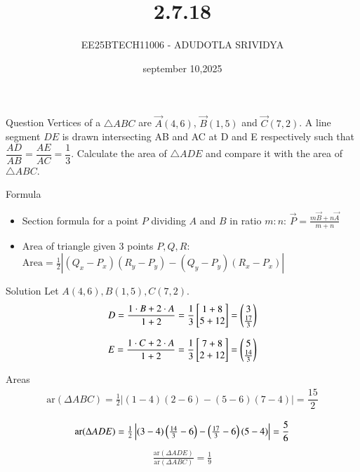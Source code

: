 \documentclass{beamer}
\title %
{2.7.18}
\date{september 10,2025}
\author %
{EE25BTECH11006 - ADUDOTLA SRIVIDYA}
\begin{document}
\frame{\titlepage}

\begin{frame}{Question}
Vertices of a $\triangle ABC$ are $\vec{A}(4,6)$, $\vec{B}(1,5)$ and $\vec{C}(7,2)$.  
A line segment $DE$ is drawn intersecting AB and AC at D and E respectively such that  
$\dfrac{AD}{AB} = \dfrac{AE}{AC} = \dfrac{1}{3}$.  
Calculate the area of $\triangle ADE$ and compare it with the area of $\triangle ABC$.
\end{frame}

\begin{frame}{Formula}
\begin{itemize}
    \item Section formula for a point $P$ dividing $A$ and $B$ in ratio $m:n$:
    $
    \vec{P} = \frac{m\vec{B}+n\vec{A}}{m+n}
    $
    \item Area of triangle given 3 points $P,Q,R$:
    $
    \text{Area} = \frac{1}{2}\left| 
    (Q_x-P_x)(R_y-P_y) - (Q_y-P_y)(R_x-P_x)
    \right|
    $
\end{itemize}
\end{frame}

\begin{frame}{Solution}
Let $A(4,6), B(1,5), C(7,2)$.
\begin{align}
D = \frac{1\cdot B + 2\cdot A}{1+2}
= \frac{1}{3}\begin{bmatrix}1+8 \\ 5+12 \end{bmatrix}
= \begin{pmatrix}3\\\tfrac{17}{3}\end{pmatrix}
\end{align}

\begin{align}
E = \frac{1\cdot C + 2\cdot A}{1+2}
= \frac{1}{3}\begin{bmatrix}7+8 \\ 2+12 \end{bmatrix}
= \begin{pmatrix}5\\\tfrac{14}{3}\end{pmatrix}
\end{align}
\end{frame}

\begin{frame}{Areas}
\begin{align}
\text{ar}(\Delta ABC) = \tfrac{1}{2}\left|
(1-4)(2-6) - (5-6)(7-4) \right| = \dfrac{15}{2}
\end{align}

\begin{align}
\text{ar}(\Delta ADE) = \tfrac{1}{2}\left|
(3-4)\left(\tfrac{14}{3}-6\right) - \left(\tfrac{17}{3}-6\right)(5-4) \right| = \dfrac{5}{6}
\end{align}
\begin{align}
\frac{\text{ar}(\Delta ADE)}{\text{ar}(\Delta ABC)} = \frac{1}{9}
\end{align}
\end{frame}
\end{document}
